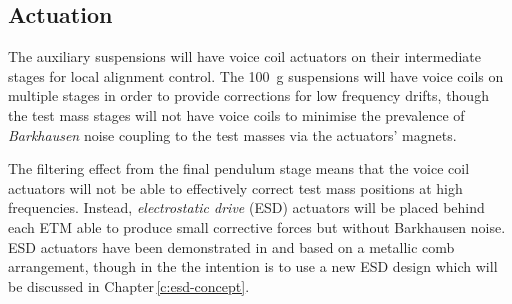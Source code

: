 \subsection{\label{sec:ssm-actuation}Actuation}
The auxiliary suspensions will have voice coil actuators on their intermediate stages for local alignment control. The \SI{100}{\gram} suspensions will have voice coils on multiple stages in order to provide corrections for low frequency drifts, though the test mass stages will not have voice coils to minimise the prevalence of \emph{Barkhausen} noise \cite{Weiss2008} coupling to the test masses via the actuators' magnets.

The filtering effect from the final pendulum stage means that the voice coil actuators will not be able to effectively correct test mass positions at high frequencies. Instead, \emph{electrostatic drive} (\gls{ESD}) actuators will be placed behind each \gls{ETM} able to produce small corrective forces but without Barkhausen noise. \gls{ESD} actuators have been demonstrated in \GEO{} \cite{Hewitson2007} and \ALIGO{} \cite{Aston2012} based on a metallic comb arrangement, though in the \SSMEXPT{} the intention is to use a new \gls{ESD} design which will be discussed in Chapter\,\ref{c:esd-concept}.

